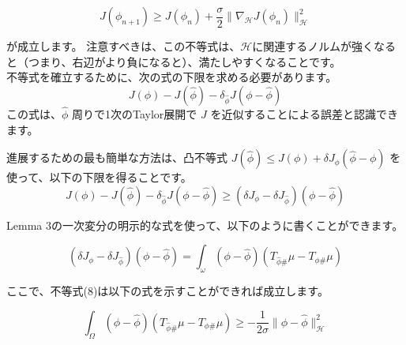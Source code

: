 \documentclass{jsarticle}
\theoremstyle{definition}
\begin{document}
$$
J(\phi_{n+1})\geq J(\phi_n) + \frac{\sigma}{2}\|\nabla_\mathcal{H}  J(\phi_n)\|_\mathcal{H}^2
$$

が成立します。
注意すべきは、この不等式は、$\mathcal{H} $に関連するノルムが強くなると（つまり、右辺がより負になると）、満たしやすくなることです。\\


不等式を確立するために、次の式の下限を求める必要があります。
$$
J(\phi) - J(\hat{\phi}) - \delta_{\hat{\phi}} J (\phi - \hat{\phi})
$$
この式は、$\hat{\phi}$ 周りで1次のTaylor展開で $J$ を近似することによる誤差と認識できます。

{\color{teal}
進展するための最も簡単な方法は、凸不等式 $J(\hat{\phi}) \le J(\phi) + \delta J_{\phi}(\hat{\phi} - \phi)$ を使って、以下の下限を得ることです。}
$$
J(\phi) - J(\hat{\phi}) - \delta_{\hat{\phi}} J(\phi-\hat{\phi}) \ge (\delta J_{\phi} - \delta J_{\hat{\phi}}) (\phi - \hat{\phi})
$$


Lemma 3の一次変分の明示的な式を使って、以下のように書くことができます。



$$
(\delta J_\phi - \delta J_{\hat{\phi}})(\phi - \hat{\phi}) = \int_\omega (\phi - \hat{\phi})(T_{\hat{\phi} \#} \mu - T_{\phi \#} \mu)
$$

ここで、不等式(8)は以下の式を示すことができれば成立します。

$$
\int_\Omega (\phi - \hat{\phi})(T_{\hat{\phi} \#} \mu - T_{\phi \#} \mu) \geq - \frac{1}{2\sigma} \|\phi - \hat{\phi}\|_\mathcal{H}^2
$$\\
\end{document}
